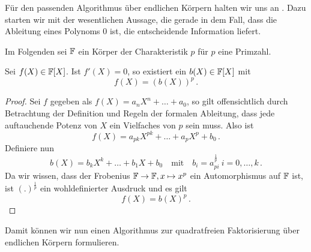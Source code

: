Für den passenden Algorithmus über endlichen Körpern halten wir uns an
\autocite[Section 8.3]{geddes:algorithms}. Dazu starten wir mit der
wesentlichen Aussage, die gerade in dem Fall, dass die Ableitung eines Polynoms
$0$ ist, die entscheidende Information liefert.

Im Folgenden sei $\mathbb{F}$ ein Körper der Charakteristik $p$ für $p$ eine Primzahl.

\begin{prop}
  Sei $f(X) \in \mathbb{F}[X]$. Ist $f'(X) = 0$, so existiert ein $b(X) \in \mathbb{F}[X]$ mit
  \[ f(X) = (b(X))^p\,.\]
\end{prop}

\begin{proof}
  Sei $f$ gegeben als $f(X) = a_nX^n + \ldots + a_0$, so gilt offensichtlich
  durch Betrachtung der Definition und Regeln der formalen Ableitung, dass
  jede auftauchende Potenz von $X$ ein Vielfaches von $p$ sein muss. Also ist
  \[ f(X) = a_{pk} X^{pk} + \ldots + a_p X^p + b_0\,.\]
  Definiere nun 
  \[ b(X) = b_k X^k + \ldots + b_1 X + b_0 \quad\text{mit}\quad
    b_i = a_{pi}^{\tfrac 1 p}\ i=0,\ldots,k\,.\]
  Da wir wissen, dass der Frobenius $\mathbb{F} \to \mathbb{F}, x \mapsto x^p$ ein
  Automorphismus auf $\mathbb{F}$ ist, ist $(.)^{\tfrac 1 p}$ ein wohldefinierter
  Ausdruck und es gilt 
  \[ f(X) = b(X)^p\,.\]
\end{proof}


Damit können wir nun einen Algorithmus zur quadratfreien Faktorisierung über
endlichen Körpern formulieren.





